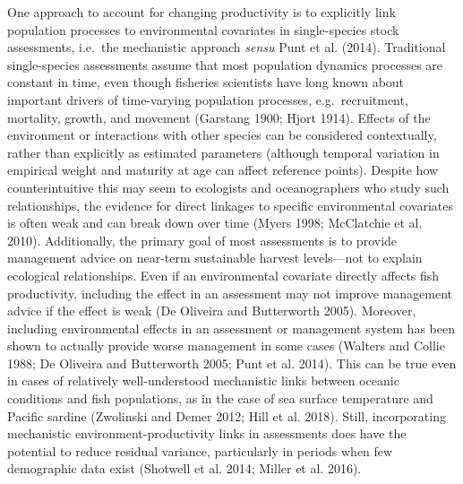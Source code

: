 \documentclass[]{article}
\begin{document}
One approach to account for changing productivity is to explicitly link
population processes to environmental covariates in single-species stock
assessments, i.e.~the mechanistic approach \emph{sensu} Punt et al.
(2014). Traditional single-species assessments assume that most
population dynamics processes are constant in time, even though
fisheries scientists have long known about important drivers of
time-varying population processes, e.g.~recruitment, mortality, growth,
and movement (Garstang 1900; Hjort 1914). Effects of the environment or
interactions with other species can be considered contextually, rather
than explicitly as estimated parameters (although temporal variation in
empirical weight and maturity at age can affect reference points).
Despite how counterintuitive this may seem to ecologists and
oceanographers who study such relationships, the evidence for direct
linkages to specific environmental covariates is often weak and can
break down over time (Myers 1998; McClatchie et al. 2010). Additionally,
the primary goal of most assessments is to provide management advice on
near-term sustainable harvest levels---not to explain ecological
relationships. Even if an environmental covariate directly affects fish
productivity, including the effect in an assessment may not improve
management advice if the effect is weak (De Oliveira and Butterworth
2005). Moreover, including environmental effects in an assessment or
management system has been shown to actually provide worse management in
some cases (Walters and Collie 1988; De Oliveira and Butterworth 2005;
Punt et al. 2014). This can be true even in cases of relatively
well-understood mechanistic links between oceanic conditions and fish
populations, as in the case of sea surface temperature and Pacific
sardine (Zwolinski and Demer 2012; Hill et al. 2018). Still,
incorporating mechanistic environment-productivity links in assessments
does have the potential to reduce residual variance, particularly in
periods when few demographic data exist (Shotwell et al. 2014; Miller et
al. 2016).
\end{document}
